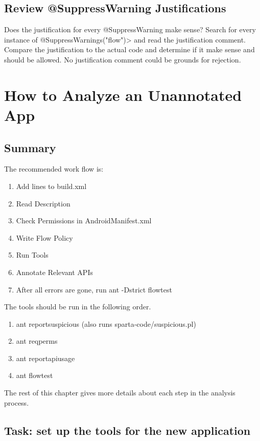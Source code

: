 \subsection{Review @SuppressWarning Justifications}
 Does the justification for every @SuppressWarning make sense? Search for every instance of 
 \<@SuppressWarnings("flow")> and read the justification comment.  Compare the justification to the
  actual code and determine if it make sense and should be allowed.  No justification comment 
  could be grounds for rejection.
  
\section{How to Analyze an Unannotated App}

\subsection{Summary}

The recommended work flow is:  

\begin{enumerate}
\item Add lines to build.xml
\item Read Description
\item Check Permissions in AndroidManifest.xml
\item Write Flow Policy
\item Run Tools
\item Annotate Relevant APIs
\item After all errors are gone, run ant -Dstrict flowtest
\end{enumerate}

\noindent 
The tools should be run in the following order. 

\begin{enumerate}
\item ant reportsuspicious (also runs sparta-code/suspicious.pl)
\item ant reqperms
\item ant reportapiusage
\item ant flowtest
\end{enumerate}

\noindent 
The rest of this chapter gives more details about each step in the analysis process.


\subsection{Task:  set up the tools for the new application}
\label{subsec:setupapp}

